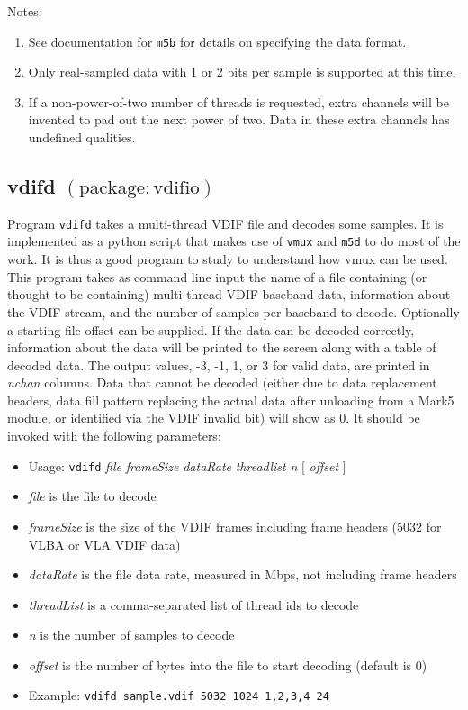 \noindent
Notes:
\begin{enumerate}
\item See documentation for {\tt m5b} for details on specifying the data format.
\item Only real-sampled data with 1 or 2 bits per sample is supported at this time.
\item If a non-power-of-two number of threads is requested, extra channels will be invented to pad out the next power of two.
Data in these extra channels has undefined qualities.
\end{enumerate}




\subsection{vdifd {\small $\mathrm{(package: vdifio)}$}} \label{sec:vdifd}

Program {\tt vdifd} takes a multi-thread VDIF file and decodes some samples.
It is implemented as a python script that makes use of {\tt vmux} and {\tt m5d} to do most of the work.
It is thus a good program to study to understand how vmux can be used.
This program takes as command line input the name of a file containing (or thought to be containing) multi-thread VDIF baseband data, information about the VDIF stream, and the number of samples per baseband to decode.
Optionally a starting file offset can be supplied.
If the data can be decoded correctly, information about the data will be printed to the screen along with a table of decoded data.
The output values, -3, -1, 1, or 3 for valid data, are printed in {\em nchan} columns.
Data that cannot be decoded (either due to data replacement headers, data fill pattern replacing the actual data after unloading from a Mark5 module, or identified via the VDIF invalid bit) will show as 0.
It should be invoked with the following parameters:

\begin{itemize}
\item[] Usage: {\tt vdifd} {\em file} {\em frameSize} {\em dataRate} {\em threadlist} {\em n} $[$ {\em offset} $]$ 
\item[] {\em file} is the file to decode
\item[] {\em frameSize} is the size of the VDIF frames including frame headers (5032 for VLBA or VLA VDIF data)
\item[] {\em dataRate} is the file data rate, measured in Mbps, not including frame headers
\item[] {\em threadList} is a comma-separated list of thread ids to decode
\item[] {\em n} is the number of samples to decode
\item[] {\em offset} is the number of bytes into the file to start decoding (default is 0)
\item[] Example: {\tt vdifd sample.vdif 5032 1024 1,2,3,4 24}
\end{itemize}

